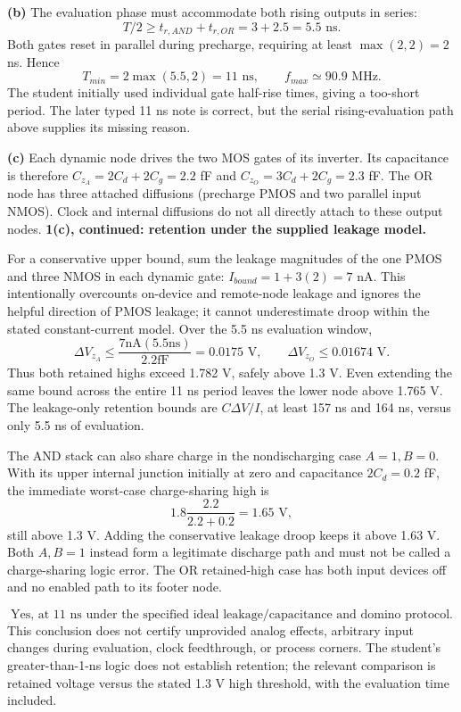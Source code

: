 \documentclass[10pt]{article}
\begin{document}
\textbf{(b)} The evaluation phase must accommodate both rising outputs in series:
\[T/2\ge t_{r,AND}+t_{r,OR}=3+2.5=5.5\text{ ns}.\]
Both gates reset in parallel during precharge, requiring at least $\max(2,2)=2$ ns. Hence
\[\boxed{T_{min}=2\max(5.5,2)=11\text{ ns},\qquad f_{max}\simeq90.9\text{ MHz}.}\]
The student initially used individual gate half-rise times, giving a too-short period. The later typed 11 ns note is correct, but the serial rising-evaluation path above supplies its missing reason.

\textbf{(c)} Each dynamic node drives the two MOS gates of its inverter. Its capacitance is therefore $C_{z_A}=2C_d+2C_g=2.2$ fF and $C_{z_O}=3C_d+2C_g=2.3$ fF. The OR node has three attached diffusions (precharge PMOS and two parallel input NMOS). Clock and internal diffusions do not all directly attach to these output nodes.
\newpage
\textbf{1(c), continued: retention under the supplied leakage model.}

For a conservative upper bound, sum the leakage magnitudes of the one PMOS and three NMOS in each dynamic gate: $I_{bound}=1+3(2)=7$ nA. This intentionally overcounts on-device and remote-node leakage and ignores the helpful direction of PMOS leakage; it cannot underestimate droop within the stated constant-current model. Over the 5.5 ns evaluation window,
\[\Delta V_{z_A}\le\frac{7\mathrm{nA}(5.5\mathrm{ns})}{2.2\mathrm{fF}}=0.0175\text{ V},\qquad \Delta V_{z_O}\le0.01674\text{ V}.\]
Thus both retained highs exceed 1.782 V, safely above 1.3 V. Even extending the same bound across the entire 11 ns period leaves the lower node above 1.765 V. The leakage-only retention bounds are $C\Delta V/I$, at least 157 ns and 164 ns, versus only 5.5 ns of evaluation.

The AND stack can also share charge in the nondischarging case $A=1,B=0$. With its upper internal junction initially at zero and capacitance $2C_d=0.2$ fF, the immediate worst-case charge-sharing high is
\[1.8\frac{2.2}{2.2+0.2}=1.65\text{ V},\]
still above 1.3 V. Adding the conservative leakage droop keeps it above 1.63 V. Both $A,B=1$ instead form a legitimate discharge path and must not be called a charge-sharing logic error. The OR retained-high case has both input devices off and no enabled path to its footer node.

\[\boxed{\text{Yes, at 11 ns under the specified ideal leakage/capacitance and domino protocol.}}\]
This conclusion does not certify unprovided analog effects, arbitrary input changes during evaluation, clock feedthrough, or process corners. The student's greater-than-1-ns logic does not establish retention; the relevant comparison is retained voltage versus the stated 1.3 V high threshold, with the evaluation time included.
\end{document}

